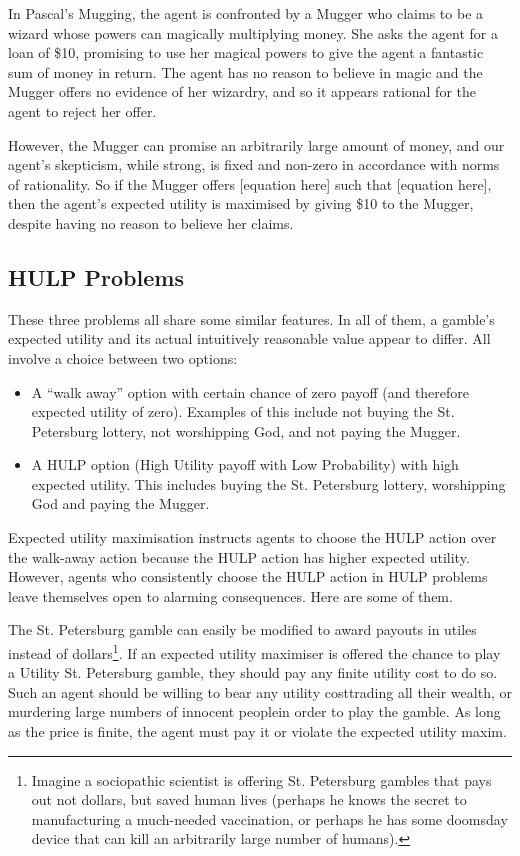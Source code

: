 \documentclass{article}
\begin{document}
In Pascal's Mugging, the agent is confronted by a Mugger who claims to be a wizard whose powers can magically multiplying money. She asks the agent for a loan of \$10, promising to use her magical powers to give the agent a fantastic sum of money in return. The agent has no reason to believe in magic and the Mugger offers no evidence of her wizardry, and so it appears rational for the agent to reject her offer.

However, the Mugger can promise an arbitrarily large amount of money, and our agent's skepticism, while strong, is fixed and non-zero in accordance with norms of rationality. So if the Mugger offers [equation here] such that [equation here], then the agent's expected utility is maximised by giving \$10 to the Mugger, despite having no reason to believe her claims.

\subsection{HULP Problems}
These three problems all share some similar features. In all of them, a gamble's expected utility and its actual intuitively reasonable value appear to differ. All involve a choice between two options:

\begin{itemize}
\item A “walk away” option with certain chance of zero payoff (and therefore expected utility of zero). Examples of this include not buying the St. Petersburg lottery, not worshipping God, and not paying the Mugger.
\item A HULP option (High Utility payoff with Low Probability) with high expected utility. This includes buying the St. Petersburg lottery, worshipping God and paying the Mugger.
\end{itemize}

Expected utility maximisation instructs agents to choose the HULP action over the walk-away action because the HULP action has higher expected utility. However, agents who consistently choose the HULP action in HULP problems leave themselves open to alarming consequences. Here are some of them.

The St. Petersburg gamble can easily be modified to award payouts in utiles instead of dollars\footnote{Imagine a sociopathic scientist is offering St. Petersburg gambles that pays out not dollars, but saved human lives (perhaps he knows the secret to manufacturing a much-needed vaccination, or perhaps he has some doomsday device that can kill an arbitrarily large number of humans).}. If an expected utility maximiser is offered the chance to play a Utility St. Petersburg gamble, they should pay any finite utility cost to do so. Such an agent should be willing to bear any utility cost\textemdash trading all their wealth, or murdering large numbers of innocent people\textemdash in order to play the gamble. As long as the price is finite, the agent must pay it or violate the expected utility maxim.
\end{document}
